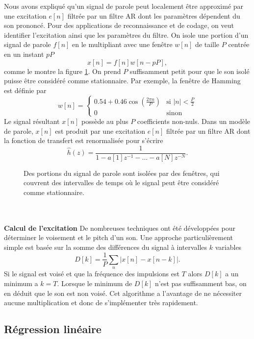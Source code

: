 Nous avons expliqu\'e qu'un signal de parole peut localement
\^etre approxim\'e par une excitation $e[n]$
filtr\'ee par un filtre AR dont
les param\`etres d\'ependent du son prononc\'e. Pour des applications
de reconnaissance et de codage, on veut identifier l'excitation
ainsi que les param\`etres du filtre.
On isole une portion d'un signal de parole $f[n]$
en le multipliant avec une fen\^etre $w[n]$ de taille $P$
centr\'ee en un instant $pP$
\[
x[n] = f[n] w[n-pP] ,
\]
comme le montre la figure \ref{fenetrage}.
On prend $P$
suffisamment petit pour que le son isol\'e puisse \^etre consid\'er\'e
comme stationnaire. Par exemple, la fen\^etre de
Hamming est d\'efinie par
\[
w[n] =
\left\{
\begin{array}{ll}
0.54 + 0.46 \cos (\frac {2\pi n} P ) &
\mbox{si $|n| < \frac P 2$}\\
0 & \mbox{sinon}
\end{array}
\right.
\]
Le signal r\'esultant $x[n]$ poss\`ede
au plus $P$ coefficients non-nuls.
Dans un mod\`ele de parole,
$x[n]$ est produit par une excitation
$e[n]$ filtr\'ee par un filtre AR dont la fonction de transfert
est renormalis\'ee pour s'\'ecrire
\[
\hat h (z) = \frac 1 {1 - a[1] z^{-1} - ... - a[N] z^{-N}} .
\]

\begin{figure}
\vspace{4cm}
\caption{Des portions du signal de parole sont isol\'ees par
des fen\^etres, qui couvrent des intervalles de temps o\`u
le signal peut \^etre consid\'er\'e comme stationnaire.}
\label{fenetrage}
\end{figure}
\\
\\
\noindent
{\bf Calcul de l'excitation} De nombreuses techniques
ont \'et\'e d\'evelopp\'ees
pour d\'eterminer le voisement et le pitch d'un son.
Une approche particuli\`erement simple est bas\'ee sur
la somme des diff\'erences du signal \`a intervalles $k$ variables
\begin{equation}
\label{AMDF}
D[k] = \frac 1 P \sum_{n} |x[n] - x[n-k]| .
\end{equation}
Si le signal est vois\'e et que la fr\'equence des impulsions est
$T$ alors $D[k]$ a un minimum a $k = T$. Lorsque le minimum
de $D[k]$ n'est pas suffisamment bas,
on en d\'eduit que le son est non vois\'e.
Cet algorithme a l'avantage de ne n\'ecessiter aucune multiplication
et donc de s'impl\'ementer tr\`es rapidement.


\subsection{R\'egression lin\'eaire}


